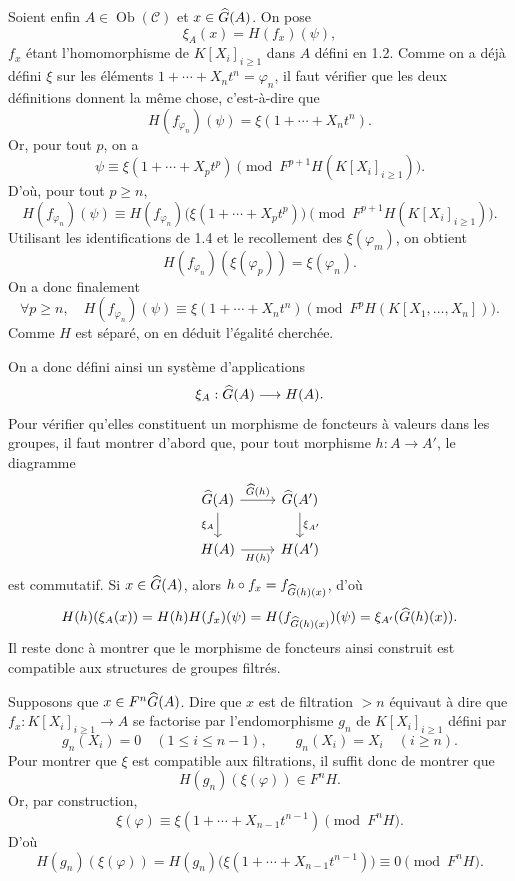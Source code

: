 \documentclass[11pt]{article}
\begin{document}
Soient enfin \(A\in\operatorname{Ob}(\mathcal C)\) et \(x\in\widehat G(A)\). On pose
\[
  \xi_A(x)=H(f_x)(\psi),
\]
\(f_x\) étant l'homomorphisme de \(K[X_i]_{i\geq 1}\) dans \(A\) défini en 1.2. Comme on a déjà défini \(\xi\) sur les éléments \(1+\cdots+X_nt^n=\varphi_n\), il faut vérifier que les deux définitions donnent la même chose, c'est-à-dire que
\[
  H(f_{\varphi_n})(\psi)=\xi(1+\cdots+X_nt^n).
\]
Or, pour tout \(p\), on a
\[
  \psi\equiv \xi(1+\cdots+X_pt^p)
  \pmod{F^{p+1}H(K[X_i]_{i\geq 1})}.
\]
D'où, pour tout \(p\geq n\),
\[
  H(f_{\varphi_n})(\psi)\equiv
  H(f_{\varphi_n})\bigl(\xi(1+\cdots+X_pt^p)\bigr)
  \pmod{F^{p+1}H(K[X_i]_{i\geq 1})}.
\]
Utilisant les identifications de 1.4 et le recollement des \(\xi(\varphi_m)\), on obtient
\[
  H(f_{\varphi_n})(\xi(\varphi_p))=\xi(\varphi_n).
\]
On a donc finalement
\[
  \forall p\geq n,\quad
  H(f_{\varphi_n})(\psi)\equiv \xi(1+\cdots+X_nt^n)
  \pmod{F^pH(K[X_1,\ldots,X_n])}.
\]
Comme \(H\) est séparé, on en déduit l'égalité cherchée.

On a donc défini ainsi un système d'applications
\[
  \xi_A:\widehat G(A)\longrightarrow H(A).
\]
Pour vérifier qu'elles constituent un morphisme de foncteurs à valeurs dans les groupes, il faut montrer d'abord que, pour tout morphisme \(h:A\to A'\), le diagramme
\[
\begin{tikzcd}
\Ghat(A) \arrow[r,"\Ghat(h)"] \arrow[d,"\xi_A"'] &
\Ghat(A') \arrow[d,"\xi_{A'}"]\\
H(A) \arrow[r,"H(h)"'] & H(A')
\end{tikzcd}
\]
est commutatif. Si \(x\in\widehat G(A)\), alors \(h\circ f_x=f_{\widehat G(h)(x)}\), d'où
\[
  H(h)(\xi_A(x))=H(h)H(f_x)(\psi)
  =H(f_{\widehat G(h)(x)})(\psi)=\xi_{A'}(\widehat G(h)(x)).
\]
Il reste donc à montrer que le morphisme de foncteurs ainsi construit est compatible aux structures de groupes filtrés.

Supposons que \(x\in F^n\widehat G(A)\). Dire que \(x\) est de filtration \(>n\) équivaut à dire que \(f_x:K[X_i]_{i\geq 1}\to A\) se factorise par l'endomorphisme \(g_n\) de \(K[X_i]_{i\geq 1}\) défini par
\[
  g_n(X_i)=0\quad (1\leq i\leq n-1),\qquad
  g_n(X_i)=X_i\quad (i\geq n).
\]
Pour montrer que \(\xi\) est compatible aux filtrations, il suffit donc de montrer que
\[
  H(g_n)(\xi(\varphi))\in F^nH.
\]
Or, par construction,
\[
  \xi(\varphi)\equiv \xi(1+\cdots+X_{n-1}t^{n-1})
  \pmod{F^nH}.
\]
D'où
\[
  H(g_n)(\xi(\varphi))
  =H(g_n)\bigl(\xi(1+\cdots+X_{n-1}t^{n-1})\bigr)
  \equiv0\pmod{F^nH}.
\]
\end{document}
